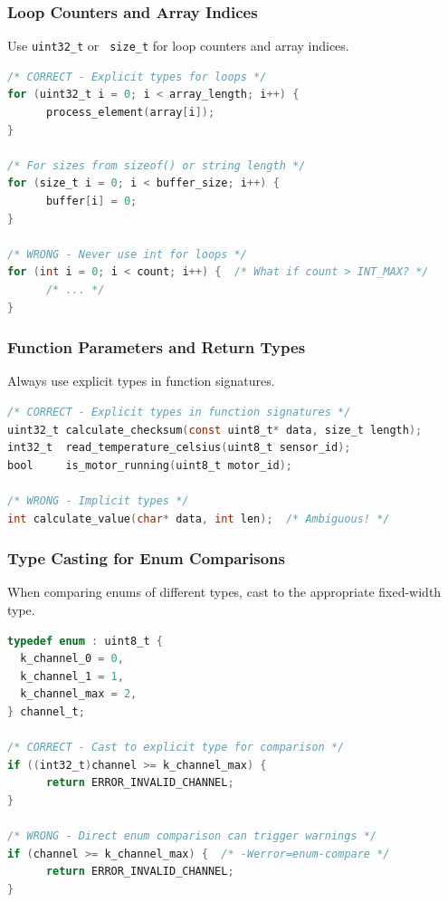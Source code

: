 \subsubsection{Loop Counters and Array Indices}

Use \texttt{uint32\_t} or \texttt{
      size\_t} for loop counters and array indices.

\begin{lstlisting}[language=C]
/* CORRECT - Explicit types for loops */
for (uint32_t i = 0; i < array_length; i++) {
      process_element(array[i]);
}

/* For sizes from sizeof() or string length */
for (size_t i = 0; i < buffer_size; i++) {
      buffer[i] = 0;
}

/* WRONG - Never use int for loops */
for (int i = 0; i < count; i++) {  /* What if count > INT_MAX? */
      /* ... */
}
\end{lstlisting}

\subsubsection{Function Parameters and Return Types}

Always use explicit types in function signatures.

\begin{lstlisting}[language=C]
/* CORRECT - Explicit types in function signatures */
uint32_t calculate_checksum(const uint8_t* data, size_t length);
int32_t  read_temperature_celsius(uint8_t sensor_id);
bool     is_motor_running(uint8_t motor_id);

/* WRONG - Implicit types */
int calculate_value(char* data, int len);  /* Ambiguous! */
\end{lstlisting}

\subsubsection{Type Casting for Enum Comparisons}

When comparing enums of different types, cast to the appropriate fixed-width type.

\begin{lstlisting}[language=C]
typedef enum : uint8_t {
  k_channel_0 = 0,
  k_channel_1 = 1,
  k_channel_max = 2,
} channel_t;

/* CORRECT - Cast to explicit type for comparison */
if ((int32_t)channel >= k_channel_max) {
      return ERROR_INVALID_CHANNEL;
}

/* WRONG - Direct enum comparison can trigger warnings */
if (channel >= k_channel_max) {  /* -Werror=enum-compare */
      return ERROR_INVALID_CHANNEL;
}
\end{lstlisting}

